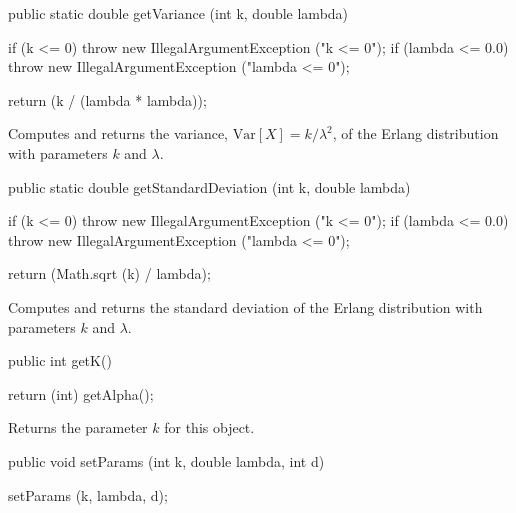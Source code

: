 \begin{htmlonly}
\end{htmlonly}
\begin{code}

   public static double getVariance (int k, double lambda)\begin{hide} {
      if (k <= 0)
         throw new IllegalArgumentException ("k <= 0");
      if (lambda <= 0.0)
         throw new IllegalArgumentException ("lambda <= 0");

      return (k / (lambda * lambda));
   }\end{hide}
\end{code}
\begin{tabb}  Computes and returns the variance, $\mbox{Var}[X] = k/\lambda^2$,
   of the Erlang distribution with parameters $k$ and $\lambda$.
\end{tabb}
\begin{htmlonly}
\end{htmlonly}
\begin{code}

   public static double getStandardDeviation (int k, double lambda)\begin{hide} {
      if (k <= 0)
         throw new IllegalArgumentException ("k <= 0");
      if (lambda <= 0.0)
         throw new IllegalArgumentException ("lambda <= 0");

      return (Math.sqrt (k) / lambda);
   }\end{hide}
\end{code}
\begin{tabb}  Computes and returns the standard deviation of the Erlang
   distribution with parameters $k$ and $\lambda$.
\end{tabb}
\begin{htmlonly}
\end{htmlonly}
\begin{code}

   public int getK()\begin{hide} {
      return (int) getAlpha();
   }\end{hide}
\end{code}
  \begin{tabb} Returns the parameter $k$ for this object.
  \end{tabb}
\begin{code}

   public void setParams (int k, double lambda, int d)\begin{hide} {
      setParams (k, lambda, d);
   }\end{hide}
\end{code}
